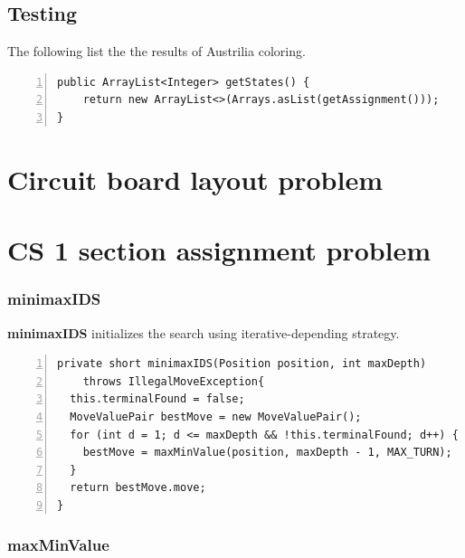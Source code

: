 \documentclass{article}
\begin{document}
\subsection{Testing}
The following list the the results of Austrilia coloring.

\begin{lstlisting}[numbers=left]   
public ArrayList<Integer> getStates() {
    return new ArrayList<>(Arrays.asList(getAssignment()));
}
\end{lstlisting}


\section{Circuit board layout problem}
\section{CS 1 section assignment problem}

































\subsubsection{minimaxIDS}

\textbf{minimaxIDS} initializes the search using iterative-depending strategy.


\begin{lstlisting}[numbers=left]
private short minimaxIDS(Position position, int maxDepth) 
    throws IllegalMoveException{
  this.terminalFound = false;
  MoveValuePair bestMove = new MoveValuePair();
  for (int d = 1; d <= maxDepth && !this.terminalFound; d++) {
    bestMove = maxMinValue(position, maxDepth - 1, MAX_TURN);
  }
  return bestMove.move;
}
\end{lstlisting}


\subsubsection{maxMinValue}
\end{document}
